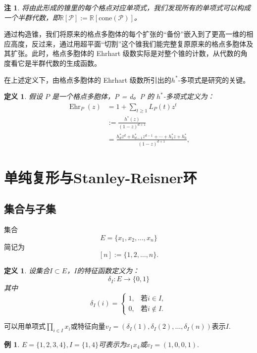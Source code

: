\documentclass[12pt,a4paper]{ctexbook} %
\newcounter{theorem}[section]
\newtheorem{definition}[theorem]{定义}
\newtheorem{example}[theorem]{例}
\newtheorem{remark}[theorem]{注}
\numberwithin{figure}{section}
\theoremstyle{problemstyle}
\numberwithin{equation}{section} %
\begin{document}
\begin{remark}
    将由此形成的锥里的每个格点对应单项式，我们发现所有的单项式可以构成一个半群代数，即$\mathbb{R}[\mathcal{P}] := \mathbb{R}[\text{cone}(\mathcal{P})]$。
\end{remark}

通过构造锥，我们将原来的格点多胞体的每个扩张的“备份”嵌入到了更高一维的相应高度，反过来，通过用超平面“切割”这个锥我们能完整复原原来的格点多胞体及其扩张。此时，格点多胞体的 Ehrhart 级数实际是对整个锥的计数，从代数的角度看它是半群代数的生成函数。

在上述定义下，由格点多胞体的 Ehrhart 级数所引出的$h^*$-多项式是研究的关键。

\begin{definition}
    假设 $P$ 是一个格点多胞体，P = d。P 的 $h^*$-多项式定义为：
\begin{align*}
    \operatorname{Ehr}_P(z) 
    &= 1 + \sum_{t \geq 1} L_P(t) z^t \\
    &:= \frac{h^*(z)}{(1-z)^{d+1}} \\
    &=\frac{h_d^* z^d + h_{d-1}^* z^{d-1} + \cdots + h_1^* z + h_0^*}{(1 - z)^{d+1}},
\end{align*}
\end{definition}

\maketitle
	\section{单纯复形与Stanley-Reisner环}
	\subsection{集合与子集}
	集合$$E=\{x_1,x_2,\dots,x_n\}$$简记为$$[n]:=\{1,2,\dots,n\}.$$
	
	\begin{definition}
		设集合$I\subset E$，$I$的特征函数定义为：$$\delta_I:E\to \{0,1\}$$其中
		$$\delta_I(i)=
		\begin{cases}
			1,& \mbox{若}i\in I,\\
			0,& \mbox{若}i\notin I.
		\end{cases}$$
	\end{definition}
	
	可以用单项式$\prod_{i\in I}x_i$或特征向量$v_I=(\delta_I(1),\delta_I(2),\dots, \delta_I(n))$表示$I$. 
	
	\begin{example}
		$E=\{1,2,3,4\}, I=\{1,4\}$可表示为$x_1x_4$或$v_I=(1,0,0,1).$
	\end{example}
	
\end{document}
